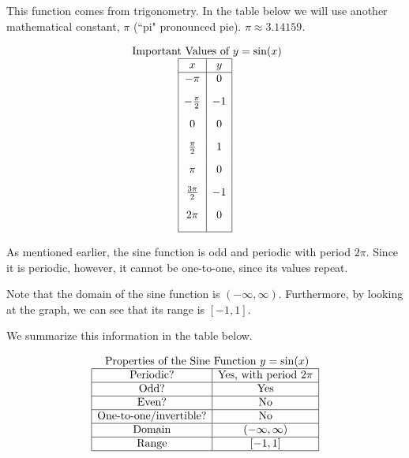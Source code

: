 \documentclass[nooutcomes]{ximera}
\begin{document}
 
 
This function comes from trigonometry. In the table below we will use another mathematical constant, $\pi$ (``pi" pronounced pie). $\pi \approx 3.14159$.
 
\begin{center}
\end{center}
 
\[
\begin{array}{ c }
 \text{ Important Values of  $y=\sin(x)$}\\
\begin{array}{|c|c|}
 \hline
 x & y\\
 \hline
 -\pi&0\\[2ex]
 -\frac{\pi}{2}&-1\\[2ex]
 0&0\\[2ex]
 \frac{\pi}{2}&1\\[2ex]
 \pi&0\\[2ex]
\frac{3\pi}{2}&-1\\[2ex]
 2 \pi&0\\[2ex]
\hline
\end{array}
\end{array}
\]
 
 
As mentioned earlier, the sine function is odd and periodic with period $2\pi$. Since it is periodic, however, it cannot be one-to-one, since its values repeat.
 
Note that the domain of the sine function is $(-\infty, \infty)$. Furthermore, by looking at the graph, we can see that its range is $[-1, 1]$.
 
We summarize this information in the table below.
 
 
\[
\begin{array}{ c }
 \text{ Properties of the Sine Function } y=\sin(x) \\
\begin{array}{|c|c|}
 \hline
\text{Periodic?} & \text{Yes, with period }2\pi \\ \hline
\text{Odd?} & \text{Yes} \\ \hline
\text{Even?} & \text{No} \\ \hline
\text{One-to-one/invertible?} & \text{No} \\ \hline
\text{Domain} & (-\infty,\infty)\\ \hline
\text{Range} & [-1,1]\\ \hline
\end{array}
\end{array}
\]
 
\end{document}
